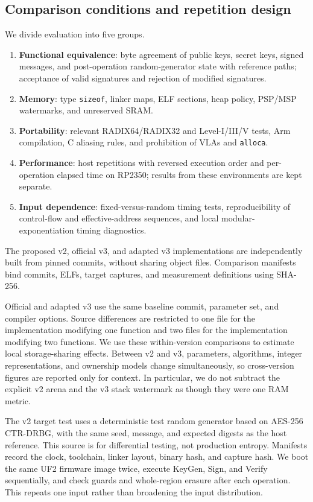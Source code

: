 \documentclass[a4paper,10pt]{article}
\theoremstyle{definition}
\theoremstyle{remark}
\begin{document}
\subsection{Comparison conditions and repetition design}
\label{sec:version-isolation}

We divide evaluation into five groups.

\begin{enumerate}[leftmargin=2.2em]
  \item \textbf{Functional equivalence}: byte agreement of public keys, secret keys, signed messages, and post-operation random-generator state with reference paths; acceptance of valid signatures and rejection of modified signatures.
  \item \textbf{Memory}: type \texttt{sizeof}, linker maps, ELF sections, heap policy, PSP/MSP watermarks, and unreserved SRAM.
  \item \textbf{Portability}: relevant RADIX64/RADIX32 and Level-I/III/V tests, Arm compilation, C aliasing rules, and prohibition of VLAs and \texttt{alloca}.
  \item \textbf{Performance}: host repetitions with reversed execution order and per-operation elapsed time on RP2350; results from these environments are kept separate.
  \item \textbf{Input dependence}: fixed-versus-random timing tests, reproducibility of control-flow and effective-address sequences, and local modular-exponentiation timing diagnostics.
\end{enumerate}

The proposed v2, official v3, and adapted v3 implementations are independently built from pinned commits, without sharing object files. Comparison manifests bind commits, ELFs, target captures, and measurement definitions using SHA-256.

Official and adapted v3 use the same baseline commit, parameter set, and compiler options. Source differences are restricted to one file for the implementation modifying one function and two files for the implementation modifying two functions. We use these within-version comparisons to estimate local storage-sharing effects. Between v2 and v3, parameters, algorithms, integer representations, and ownership models change simultaneously, so cross-version figures are reported only for context. In particular, we do not subtract the explicit v2 arena and the v3 stack watermark as though they were one RAM metric.

The v2 target test uses a deterministic test random generator based on AES-256 CTR-DRBG, with the same seed, message, and expected digests as the host reference. This source is for differential testing, not production entropy. Manifests record the clock, toolchain, linker layout, binary hash, and capture hash. We boot the same UF2 firmware image twice, execute KeyGen, Sign, and Verify sequentially, and check guards and whole-region erasure after each operation. This repeats one input rather than broadening the input distribution.
\end{document}
